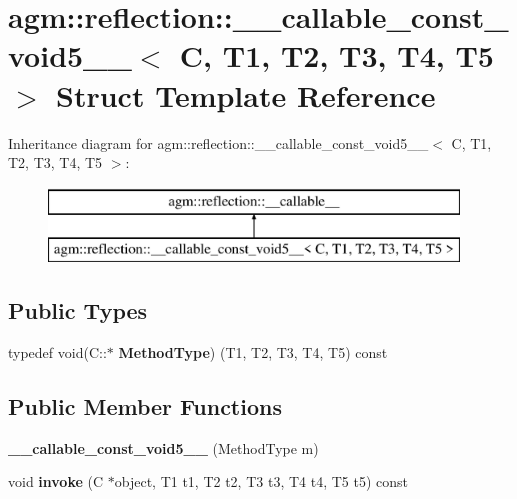 \hypertarget{structagm_1_1reflection_1_1____callable__const__void5____}{}\section{agm\+:\+:reflection\+:\+:\+\_\+\+\_\+callable\+\_\+const\+\_\+void5\+\_\+\+\_\+$<$ C, T1, T2, T3, T4, T5 $>$ Struct Template Reference}
\label{structagm_1_1reflection_1_1____callable__const__void5____}
Inheritance diagram for agm\+:\+:reflection\+:\+:\+\_\+\+\_\+callable\+\_\+const\+\_\+void5\+\_\+\+\_\+$<$ C, T1, T2, T3, T4, T5 $>$\+:\begin{figure}[H]
\begin{center}
\leavevmode
\includegraphics[height=2.000000cm]{structagm_1_1reflection_1_1____callable__const__void5____}
\end{center}
\end{figure}
\subsection*{Public Types}
\begin{DoxyCompactItemize}
\item 
typedef void(C\+::$\ast$ {\bfseries Method\+Type}) (T1, T2, T3, T4, T5) const \hypertarget{structagm_1_1reflection_1_1____callable__const__void5_____ab7aa4bd0b0350462f39cfd395507596f}{}\label{structagm_1_1reflection_1_1____callable__const__void5_____ab7aa4bd0b0350462f39cfd395507596f}

\end{DoxyCompactItemize}
\subsection*{Public Member Functions}
\begin{DoxyCompactItemize}
\item 
{\bfseries \+\_\+\+\_\+callable\+\_\+const\+\_\+void5\+\_\+\+\_\+} (Method\+Type m)\hypertarget{structagm_1_1reflection_1_1____callable__const__void5_____ae15e7d1297767ce6b6d9b1d857b3172a}{}\label{structagm_1_1reflection_1_1____callable__const__void5_____ae15e7d1297767ce6b6d9b1d857b3172a}

\item 
void {\bfseries invoke} (C $\ast$object, T1 t1, T2 t2, T3 t3, T4 t4, T5 t5) const \hypertarget{structagm_1_1reflection_1_1____callable__const__void5_____ad6952bc2dfcf56fd23c89cc669a25cae}{}\label{structagm_1_1reflection_1_1____callable__const__void5_____ad6952bc2dfcf56fd23c89cc669a25cae}

\end{DoxyCompactItemize}
